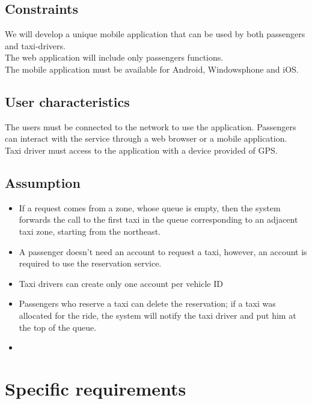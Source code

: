 \documentclass[a4paper,11pt]{report}
\begin{document}
\section{Constraints}
We will develop a unique mobile application that can be used by both passengers and taxi-drivers.\\
The web application will include only passengers functions.\\
The mobile application must be available for Android, Windowsphone and iOS.\\
\section{User characteristics}
The users must be connected to the network to use the application.
Passengers can interact with the service through a web browser or a mobile application.\\
Taxi driver must access to the application with a device provided of GPS.
\section{Assumption}
\begin{itemize}
  \item If a request comes from a zone, whose queue is empty, then the system forwards the call to the first taxi in the queue corresponding to an adjacent taxi zone, starting from the northeast.
  \item A passenger doesn't need an account to request a taxi, however, an account is required to use the reservation service. %
  \item Taxi drivers can create only one account per vehicle ID %
  \item Passengers who reserve a taxi can delete the reservation; if a taxi was allocated for the ride, the system will notify the taxi driver and put him at the top of the queue.
  \item
\end{itemize}
\chapter*{Specific requirements}
\addtocounter{chapter}{1}
\end{document}

